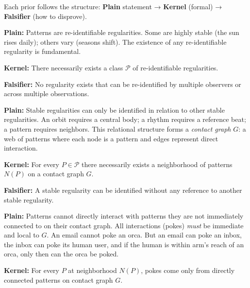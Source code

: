\noindent
Each prior follows the structure: \textbf{Plain} statement → \textbf{Kernel} (formal) → \textbf{Falsifier} (how to disprove).

\begin{description}[leftmargin=2.2cm,style=nextline]

\item[\textbf{P1 (Patterns exist).}]
\label{prior:P1}\label{prior:patterns-exist}\label{prior:A1}

\textbf{Plain:} Patterns are re-identifiable regularities. Some are highly stable (the sun rises daily); others vary (seasons shift). The existence of any re-identifiable regularity is fundamental.

\textbf{Kernel:} There necessarily exists a class $\mathcal{P}$ of re-identifiable regularities.

\textbf{Falsifier:} No regularity exists that can be re-identified by multiple observers or across multiple observations.

\item[\textbf{P2 (Patterns cannot exist in isolation).}]
\label{prior:P2}\label{prior:relational-existence}\label{prior:A3}

\textbf{Plain:} Stable regularities can only be identified in relation to other stable regularities. An orbit requires a central body; a rhythm requires a reference beat; a pattern requires neighbors. This relational structure forms a \emph{contact graph} $G$: a web of patterns where each node is a pattern and edges represent direct interaction.

\textbf{Kernel:} For every $P \in \mathcal{P}$ there necessarily exists a neighborhood of patterns $N(P)$ on a contact graph $G$.

\textbf{Falsifier:} A stable regularity can be identified without any reference to another stable regularity.

\item[\textbf{P3 (Patterns can only interact with direct contacts).}]
\label{prior:P3}\label{prior:local-interaction}\label{prior:A4}

\textbf{Plain:} Patterns cannot directly interact with patterns they are not immediately connected to on their contact graph. All interactions (pokes) \emph{must} be immediate and local to $G$. An email cannot poke an orca. But an email can poke an inbox, the inbox can poke its human user, and if the human is within arm's reach of an orca, only then can the orca be poked.

\textbf{Kernel:} For every $P$ at neighborhood $N(P)$, pokes come only from directly connected patterns on contact graph $G$.


\end{description}
